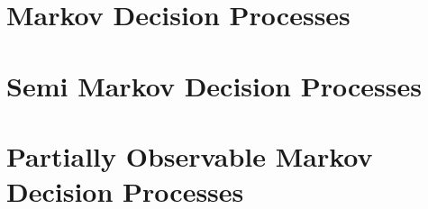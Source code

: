 \section{Markov Decision Processes}

\section{Semi Markov Decision Processes}

\section{Partially Observable Markov Decision Processes}
